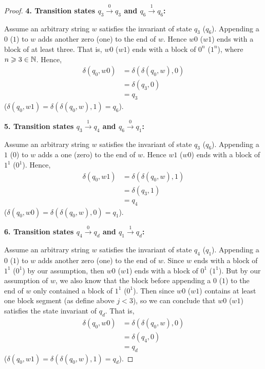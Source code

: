 \begin{proof}
\newpage
        
        \textbf{4. Transition states $q_3 \xrightarrow{0} q_3$ and $q_6 \xrightarrow{1} q_6$:}
        
        Assume an arbitrary string $w$ satisfies the invariant of state $q_3$ ($q_6$). 
        Appending a $0$ ($1$) to $w$ adds another zero (one) to the end of $w$. Hence
        $w0$ ($w1$) ends with a block of at least three. That is, 
        $w0$ ($w1$) ends with a block of $0^n$ ($1^n$), where $n \geqslant 3 \in \mathbb{N}$. Hence,
        \begin{align*}
            \delta(q_0, w0) &= \delta(\delta(q_0, w), 0) \\
            &= \delta(q_3, 0) \tag{by assumption} \\
            &= q_3
        \end{align*}
        ($\delta(q_0, w1) = \delta(\delta(q_0, w), 1) = q_6$).
        
        \vspace{5mm}
        
        \textbf{5. Transition states $q_3 \xrightarrow{1} q_4$ and $q_6 \xrightarrow{0} q_1$:}
        
        Assume an arbitrary string $w$ satisfies the invariant of state $q_3$ ($q_6$). 
        Appending a $1$ ($0$) to $w$ adds a one (zero) to the end of $w$. Hence
        $w1$ ($w0$) ends with a block of $1^1$ ($0^1$). Hence,
        \begin{align*}
            \delta(q_0, w1) &= \delta(\delta(q_0, w), 1) \\
            &= \delta(q_3, 1) \tag{by assumption} \\
            &= q_4
        \end{align*}
        ($\delta(q_0, w0) = \delta(\delta(q_0, w), 0) = q_1$).
        
        \vspace{5mm}
        
        \textbf{6. Transition states $q_4 \xrightarrow{0} q_d$ and $q_1 \xrightarrow{1} q_d$:}
        
        Assume an arbitrary string $w$ satisfies the invariant of state $q_4$ ($q_1$). 
        Appending a $0$ ($1$) to $w$ adds another zero (one) to the end of $w$. Since
        $w$ ends with a block of $1^1$ ($0^1$) by our assumption, then
        $w0$ ($w1$) ends with a block of $0^1$ ($1^1$). But by our assumption of $w$, 
        we also
        know that the block before appending a $0$ ($1$) to the end of $w$ only 
        contained a block of $1^1$ ($0^1$). Then since $w0$ ($w1$) contains at least
        one block segment (as define above $j < 3$), so we can conclude that 
        $w0$ ($w1$) satisfies the state invariant of $q_d$. That is,
        \begin{align*}
            \delta(q_0, w0) &= \delta(\delta(q_0, w), 0) \\
            &= \delta(q_4, 0) \tag{by assumption} \\
            &= q_d
        \end{align*}
        ($\delta(q_0, w1) = \delta(\delta(q_0, w), 1) = q_d$).
        

\end{proof}
